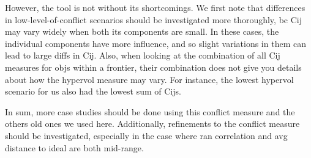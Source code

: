 However, the tool is not without its shortcomings. We first note that differences in low-level-of-conflict scenarios should be investigated more thoroughly, bc Cij may vary widely when both its components are small. In these cases, the individual components have more influence, and so slight variations in them can lead to large diffs in Cij. Also, when looking at the combination of all Cij measures for objs within a frontier, their combination does not give you details about how the hypervol measure may vary. For instance, the lowest hypervol scenario for us also had the lowest sum of Cijs.

In sum, more case studies should be done using this conflict measure and the others old ones we used here. Additionally, refinements to the conflict measure should be investigated, especially in the case where ran correlation and avg distance to ideal are both mid-range.




